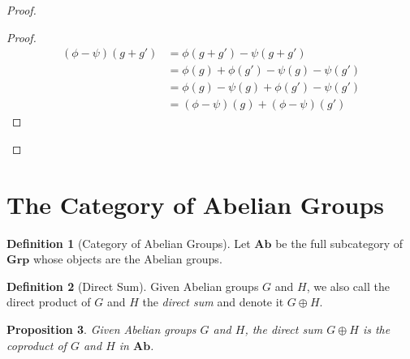 \documentclass{book}
\let\qed\relax
\newtheorem{prop}{Proposition}[chapter]
\theoremstyle{definition}
\newtheorem{df}[prop]{Definition}
\begin{document}
\begin{proof}
    \pf
    \begin{proof}
        \pf
        \begin{align*}
            (\phi - \psi)(g + g') & = \phi(g + g') - \psi(g + g') \\
            & = \phi(g) + \phi(g') - \psi(g) - \psi(g') \\
            & = \phi(g) - \psi(g) + \phi(g') - \psi(g') \\
            & = (\phi - \psi)(g) + (\phi - \psi)(g')
        \end{align*}
    \end{proof}
    \qed
\end{proof}

\section{The Category of Abelian Groups}

\begin{df}[Category of Abelian Groups]
    Let $\mathbf{Ab}$ be the full subcategory of $\mathbf{Grp}$ whose objects are the Abelian groups.
\end{df}

\begin{df}[Direct Sum]
    Given Abelian groups $G$ and $H$, we also call the direct product of $G$ and $H$ the \emph{direct sum} and denote it $G \oplus H$.
\end{df}

\begin{prop}
    Given Abelian groups $G$ and $H$, the direct sum $G \oplus H$ is the coproduct of $G$ and $H$ in $\mathbf{Ab}$.
\end{prop}
\end{document}
